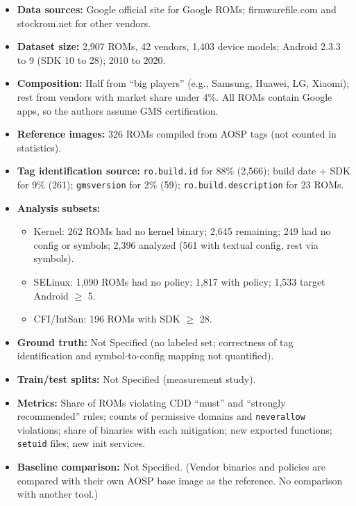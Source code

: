 \documentclass[11pt,a4paper]{article}
\begin{document}
\begin{enumerate}
    \begin{itemize}[leftmargin=*,itemsep=1pt,topsep=2pt]
        \item \textbf{Data sources:} Google official site for Google ROMs; firmwarefile.com and stockrom.net for other vendors.
        \item \textbf{Dataset size:} 2,907 ROMs, 42 vendors, 1,403 device models; Android 2.3.3 to 9 (SDK 10 to 28); 2010 to 2020.
        \item \textbf{Composition:} Half from ``big players'' (e.g., Samsung, Huawei, LG, Xiaomi); rest from vendors with market share under 4\%. All ROMs contain Google apps, so the authors assume GMS certification.
        \item \textbf{Reference images:} 326 ROMs compiled from AOSP tags (not counted in statistics).
        \item \textbf{Tag identification source:} \texttt{ro.build.id} for 88\% (2,566); build date + SDK for 9\% (261); \texttt{gmsversion} for 2\% (59); \texttt{ro.build.description} for 23 ROMs.
        \item \textbf{Analysis subsets:}
        \begin{itemize}[itemsep=0pt]
            \item Kernel: 262 ROMs had no kernel binary; 2,645 remaining; 249 had no config or symbols; 2,396 analyzed (561 with textual config, rest via symbols).
            \item SELinux: 1,090 ROMs had no policy; 1,817 with policy; 1,533 target Android $\geq$ 5.
            \item CFI/IntSan: 196 ROMs with SDK $\geq$ 28.
        \end{itemize}
        \item \textbf{Ground truth:} Not Specified (no labeled set; correctness of tag identification and symbol-to-config mapping not quantified).
        \item \textbf{Train/test splits:} Not Specified (measurement study).
        \item \textbf{Metrics:} Share of ROMs violating CDD ``must'' and ``strongly recommended'' rules; counts of permissive domains and \texttt{neverallow} violations; share of binaries with each mitigation; new exported functions; \texttt{setuid} files; new init services.
        \item \textbf{Baseline comparison:} Not Specified. (Vendor binaries and policies are compared with their own AOSP base image as the reference. No comparison with another tool.)
    \end{itemize}


\end{enumerate}
\end{document}
